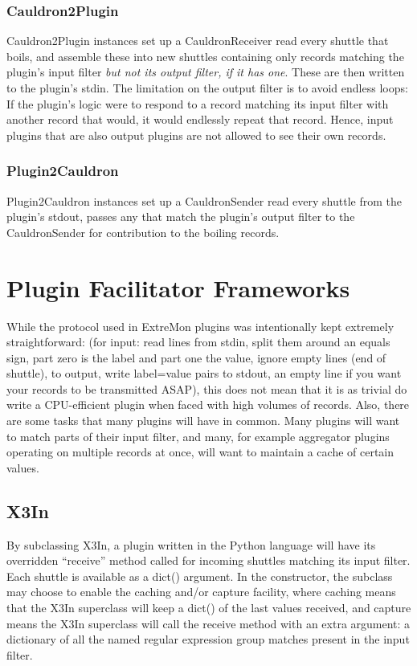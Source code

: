 \subsubsection{Cauldron2Plugin}

Cauldron2Plugin instances set up a CauldronReceiver read every shuttle
that boils, and assemble these into new shuttles containing only records
matching the plugin's input filter \emph{but not its output filter, if it
has one}.  These are then written to the plugin's stdin. The limitation
on the output filter is to avoid endless loops: If the plugin's logic
were to respond to a record matching its input filter with another record
that would, it would endlessly repeat that record. Hence, input plugins
that are also output plugins are not allowed to see their own records.

\subsubsection{Plugin2Cauldron}

Plugin2Cauldron instances set up a CauldronSender read every shuttle
from the plugin's stdout, passes any that match the plugin's output
filter to the CauldronSender for contribution to the boiling records.

\section{Plugin Facilitator Frameworks}
\label{sec:pluginfacilitators}

While the protocol used in ExtreMon plugins was intentionally kept
extremely straightforward: (for input: read lines from stdin, split them
around an equals sign, part zero is the label and part one the value,
ignore empty lines (end of shuttle), to output, write label=value pairs
to stdout, an empty line if you want your records to be transmitted
ASAP), this does not mean that it is as trivial do write a CPU-efficient
plugin when faced with high volumes of records. Also, there are some
tasks that many plugins will have in common. Many plugins will want
to match parts of their input filter, and many, for example aggregator
plugins operating on multiple records at once, will want to maintain a
cache of certain values.

\subsection{X3In}

By subclassing X3In, a plugin written in the
Python language will have its overridden ``receive'' method called for
incoming shuttles matching its input filter. Each shuttle is available
as a dict() argument.  In the constructor, the subclass may choose to
enable the caching and\slash{}or capture facility, where caching means
that the X3In superclass will keep a dict() of the last values received,
and capture means the X3In superclass will call the receive method with
an extra argument: a dictionary of all the named regular expression
group matches present in the input filter.

